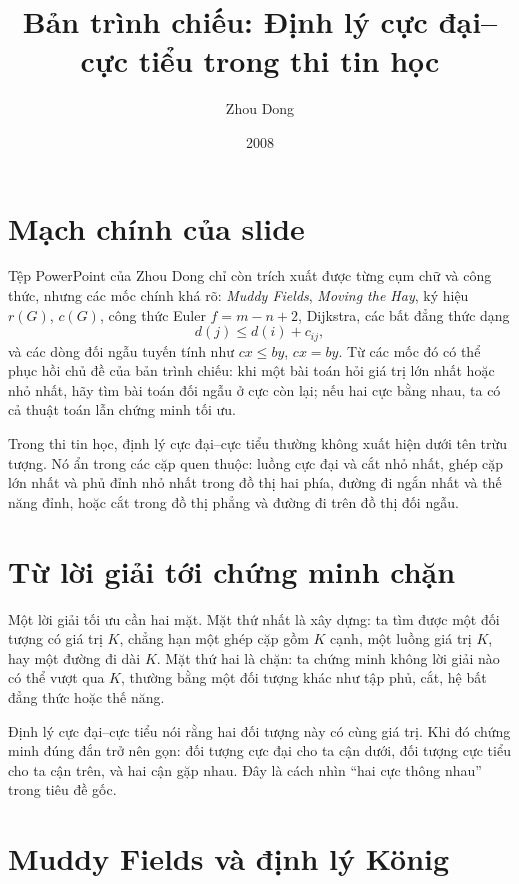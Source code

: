 \documentclass[11pt]{article}
\title{Bản trình chiếu: Định lý cực đại--cực tiểu trong thi tin học}
\author{Zhou Dong}
\date{2008}
\begin{document}
\maketitle


\section{Mạch chính của slide}

Tệp PowerPoint của Zhou Dong chỉ còn trích xuất được từng cụm chữ và công
thức, nhưng các mốc chính khá rõ: \textit{Muddy Fields}, \textit{Moving the
Hay}, ký hiệu \(r(G)\), \(c(G)\), công thức Euler \(f=m-n+2\), Dijkstra, các
bất đẳng thức dạng
\[
  d(j)\le d(i)+c_{ij},
\]
và các dòng đối ngẫu tuyến tính như \(c x\le b y\), \(c x=b y\). Từ các mốc
đó có thể phục hồi chủ đề của bản trình chiếu: khi một bài toán hỏi giá trị
lớn nhất hoặc nhỏ nhất, hãy tìm bài toán đối ngẫu ở cực còn lại; nếu hai cực
bằng nhau, ta có cả thuật toán lẫn chứng minh tối ưu.

Trong thi tin học, định lý cực đại--cực tiểu thường không xuất hiện dưới tên
trừu tượng. Nó ẩn trong các cặp quen thuộc: luồng cực đại và cắt nhỏ nhất,
ghép cặp lớn nhất và phủ đỉnh nhỏ nhất trong đồ thị hai phía, đường đi ngắn
nhất và thế năng đỉnh, hoặc cắt trong đồ thị phẳng và đường đi trên đồ thị
đối ngẫu.

\section{Từ lời giải tới chứng minh chặn}

Một lời giải tối ưu cần hai mặt. Mặt thứ nhất là xây dựng: ta tìm được một
đối tượng có giá trị \(K\), chẳng hạn một ghép cặp gồm \(K\) cạnh, một luồng
giá trị \(K\), hay một đường đi dài \(K\). Mặt thứ hai là chặn: ta chứng minh
không lời giải nào có thể vượt qua \(K\), thường bằng một đối tượng khác như
tập phủ, cắt, hệ bất đẳng thức hoặc thế năng.

Định lý cực đại--cực tiểu nói rằng hai đối tượng này có cùng giá trị. Khi đó
chứng minh đúng đắn trở nên gọn: đối tượng cực đại cho ta cận dưới, đối tượng
cực tiểu cho ta cận trên, và hai cận gặp nhau. Đây là cách nhìn ``hai cực
thông nhau'' trong tiêu đề gốc.

\section{Muddy Fields và định lý König}
\end{document}
